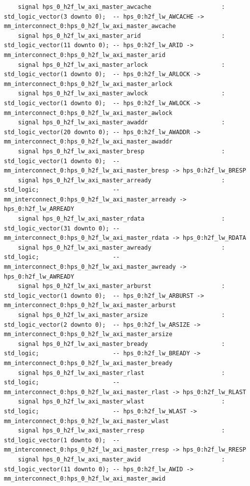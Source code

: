 \documentclass[conference]{IEEEtran}
\begin{document}
\begin{lstlisting}
	signal hps_0_h2f_lw_axi_master_awcache                    : std_logic_vector(3 downto 0);  -- hps_0:h2f_lw_AWCACHE -> mm_interconnect_0:hps_0_h2f_lw_axi_master_awcache
	signal hps_0_h2f_lw_axi_master_arid                       : std_logic_vector(11 downto 0); -- hps_0:h2f_lw_ARID -> mm_interconnect_0:hps_0_h2f_lw_axi_master_arid
	signal hps_0_h2f_lw_axi_master_arlock                     : std_logic_vector(1 downto 0);  -- hps_0:h2f_lw_ARLOCK -> mm_interconnect_0:hps_0_h2f_lw_axi_master_arlock
	signal hps_0_h2f_lw_axi_master_awlock                     : std_logic_vector(1 downto 0);  -- hps_0:h2f_lw_AWLOCK -> mm_interconnect_0:hps_0_h2f_lw_axi_master_awlock
	signal hps_0_h2f_lw_axi_master_awaddr                     : std_logic_vector(20 downto 0); -- hps_0:h2f_lw_AWADDR -> mm_interconnect_0:hps_0_h2f_lw_axi_master_awaddr
	signal hps_0_h2f_lw_axi_master_bresp                      : std_logic_vector(1 downto 0);  -- mm_interconnect_0:hps_0_h2f_lw_axi_master_bresp -> hps_0:h2f_lw_BRESP
	signal hps_0_h2f_lw_axi_master_arready                    : std_logic;                     -- mm_interconnect_0:hps_0_h2f_lw_axi_master_arready -> hps_0:h2f_lw_ARREADY
	signal hps_0_h2f_lw_axi_master_rdata                      : std_logic_vector(31 downto 0); -- mm_interconnect_0:hps_0_h2f_lw_axi_master_rdata -> hps_0:h2f_lw_RDATA
	signal hps_0_h2f_lw_axi_master_awready                    : std_logic;                     -- mm_interconnect_0:hps_0_h2f_lw_axi_master_awready -> hps_0:h2f_lw_AWREADY
	signal hps_0_h2f_lw_axi_master_arburst                    : std_logic_vector(1 downto 0);  -- hps_0:h2f_lw_ARBURST -> mm_interconnect_0:hps_0_h2f_lw_axi_master_arburst
	signal hps_0_h2f_lw_axi_master_arsize                     : std_logic_vector(2 downto 0);  -- hps_0:h2f_lw_ARSIZE -> mm_interconnect_0:hps_0_h2f_lw_axi_master_arsize
	signal hps_0_h2f_lw_axi_master_bready                     : std_logic;                     -- hps_0:h2f_lw_BREADY -> mm_interconnect_0:hps_0_h2f_lw_axi_master_bready
	signal hps_0_h2f_lw_axi_master_rlast                      : std_logic;                     -- mm_interconnect_0:hps_0_h2f_lw_axi_master_rlast -> hps_0:h2f_lw_RLAST
	signal hps_0_h2f_lw_axi_master_wlast                      : std_logic;                     -- hps_0:h2f_lw_WLAST -> mm_interconnect_0:hps_0_h2f_lw_axi_master_wlast
	signal hps_0_h2f_lw_axi_master_rresp                      : std_logic_vector(1 downto 0);  -- mm_interconnect_0:hps_0_h2f_lw_axi_master_rresp -> hps_0:h2f_lw_RRESP
	signal hps_0_h2f_lw_axi_master_awid                       : std_logic_vector(11 downto 0); -- hps_0:h2f_lw_AWID -> mm_interconnect_0:hps_0_h2f_lw_axi_master_awid

\end{lstlisting}
\end{document}
